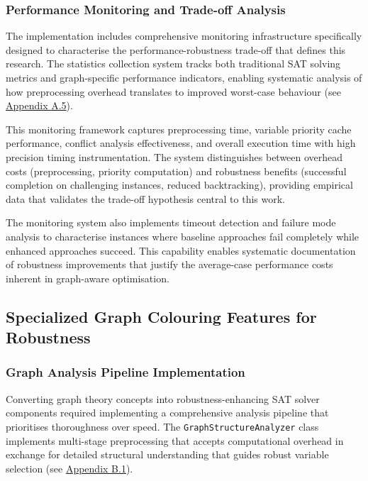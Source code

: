 \subsubsection{Performance Monitoring and Trade-off Analysis}

The implementation includes comprehensive monitoring infrastructure specifically designed to characterise the performance-robustness trade-off that defines this research. The statistics collection system tracks both traditional SAT solving metrics and graph-specific performance indicators, enabling systematic analysis of how preprocessing overhead translates to improved worst-case behaviour (see \hyperref[appendix:performance-monitoring]{Appendix A.5}).

This monitoring framework captures preprocessing time, variable priority cache performance, conflict analysis effectiveness, and overall execution time with high precision timing instrumentation. The system distinguishes between overhead costs (preprocessing, priority computation) and robustness benefits (successful completion on challenging instances, reduced backtracking), providing empirical data that validates the trade-off hypothesis central to this work.

The monitoring system also implements timeout detection and failure mode analysis to characterise instances where baseline approaches fail completely while enhanced approaches succeed. This capability enables systematic documentation of robustness improvements that justify the average-case performance costs inherent in graph-aware optimisation.

\subsection{Specialized Graph Colouring Features for Robustness}

\subsubsection{Graph Analysis Pipeline Implementation}

Converting graph theory concepts into robustness-enhancing SAT solver components required implementing a comprehensive analysis pipeline that prioritises thoroughness over speed. The \texttt{GraphStructureAnalyzer} class implements multi-stage preprocessing that accepts computational overhead in exchange for detailed structural understanding that guides robust variable selection (see \hyperref[appendix:graph-structure]{Appendix B.1}).

